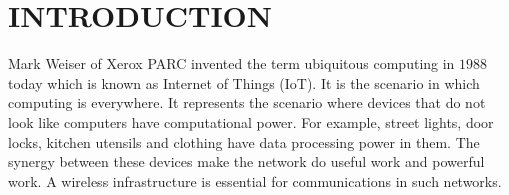 \chapter{INTRODUCTION} %
\label{cha:introduction}
	
	Mark Weiser of Xerox PARC \cite{weiser1991computer} invented the term ubiquitous computing in $1988$ today which is known as Internet of Things (IoT). 
	It is the scenario in which computing is everywhere.
	It represents the scenario where devices that do not look like computers have computational power.
	For example, street lights, door locks, kitchen utensils and clothing have data processing power in them.
	The synergy between these devices make the network do useful work and powerful work.
	A wireless infrastructure is essential for communications in such networks.


